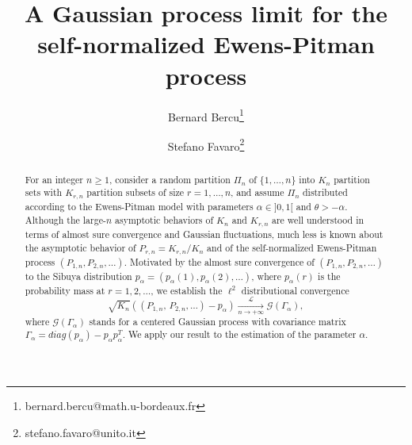 \documentclass[twoside,12pt]{article}
\newcommand{\cL}{\mathcal{L}}
\begin{document}
\title{A Gaussian process limit for the self-normalized Ewens-Pitman process}


\author[1]{Bernard Bercu\thanks{bernard.bercu@math.u-bordeaux.fr}}
\author[2]{Stefano Favaro\thanks{stefano.favaro@unito.it}}

\maketitle

\begin{abstract}
For an integer $n\geq1$, consider a random partition $\Pi_{n}$ of $\{1,\ldots,n\}$ into $K_{n}$ partition sets with $K_{r,n}$ partition subsets of size $r=1,\ldots,n$, and assume $\Pi_{n}$ distributed according to the Ewens-Pitman model with parameters $\alpha\in]0,1[$ and $\theta>-\alpha$. Although the large-$n$ asymptotic behaviors of $K_{n}$ and $K_{r,n}$ are well understood in terms of almost sure convergence and Gaussian fluctuations, much less is known about the asymptotic behavior of $P_{r,n}=K_{r,n}/K_n$ and of the self-normalized Ewens-Pitman process $(P_{1,n},P_{2,n},\dots)$. Motivated by the almost sure convergence of $(P_{1,n},P_{2,n},\dots)$ to the Sibuya distribution $p_{\alpha}=(p_{\alpha}(1),p_{\alpha}(2),\ldots)$, where $p_{\alpha}(r)$ is the probability mass at $r=1,2,\ldots$, we establish the $\ell^{2}$ distributional convergence
\begin{displaymath}
\sqrt{K_{n}}((P_{1,n},\,P_{2,n},\ldots)-p_{\alpha})\underset{n\rightarrow+\infty}{\overset{\cL}{\longrightarrow}}\mathcal{G}(\Gamma_\alpha),
\end{displaymath}
where $\mathcal{G}(\Gamma_\alpha)$ stands for a centered Gaussian process with covariance matrix $\Gamma_\alpha=diag(p_{\alpha}) - p_{\alpha} p_{\alpha}^T$. We apply our result to the estimation of the parameter
$\alpha$.

\end{abstract}
\end{document}
